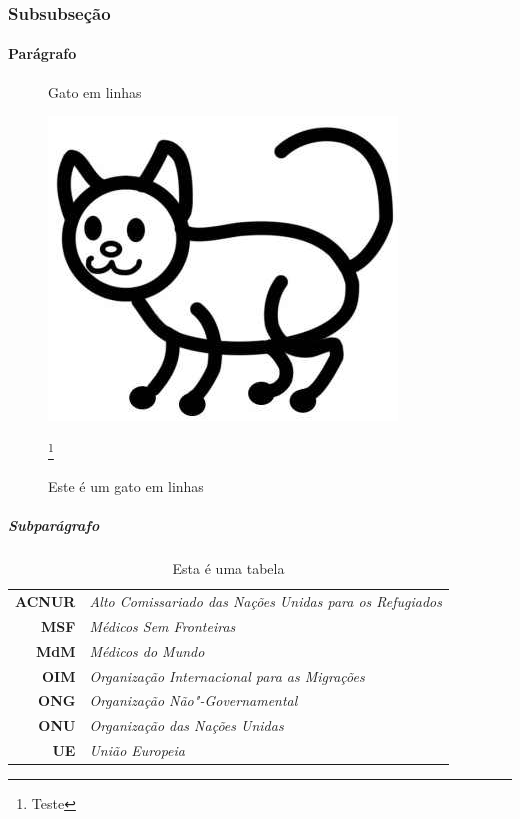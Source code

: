 \documentclass{memoir}
\begin{document}
\subsubsection{Subsubseção}
\lipsum[3]

\paragraph{Parágrafo}
\lipsum[4]

\begin{figure}[t]
\caption{Gato em linhas}
\includegraphics[width=.7\textwidth]{cat.jpg}
\caption{Este é um gato em linhas}\footnote{Teste}
\end{figure}

\subparagraph{Subparágrafo}
\lipsum[5]


\begin{table}[b]
\centering
\caption{Esta é uma tabela}
\label{my-label}
\begin{tabular}{rl}
\rowcolor[HTML]{ECF4FF} 
\textbf{ACNUR} & \textit{Alto Comissariado das Nações Unidas para os Refugiados} \\
\textbf{MSF}   & \textit{Médicos Sem Fronteiras}                                 \\
\rowcolor[HTML]{ECF4FF} 
\textbf{MdM}   & \textit{Médicos do Mundo}                                       \\
\textbf{OIM}   & \textit{Organização Internacional para as Migrações}            \\
\rowcolor[HTML]{ECF4FF} 
\textbf{ONG}   & \textit{Organização Não"-Governamental}                         \\
\textbf{ONU}   & \textit{Organização das Nações Unidas}                          \\
\rowcolor[HTML]{ECF4FF} 
\textbf{UE}    & \textit{União Europeia}                                        
\end{tabular}
\end{table}
\end{document}
